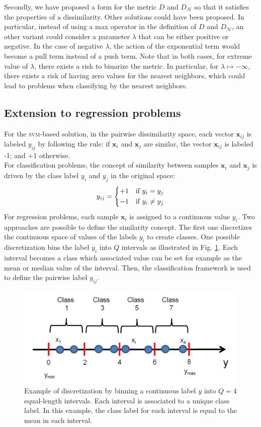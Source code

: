 Secondly, we have proposed a form for the metric $D$ and $D_\mathcal{H}$ so that it satisfies the properties of a dissimilarity. Other solutions could have been proposed. In particular, instead of using a max operator in the definition of $D$ and $D_\mathcal{H}$, an other variant could consider a parameter $\lambda$ that can be either positive or negative. In the case of negative $\lambda$, the action of the exponential term would become a pull term instead of a push term. Note that in both cases, for extreme value of $\lambda$, there exists a risk to binarize the metric. In particular, for $\lambda \mapsto - \infty$, there exists a risk of having zero values for the nearest neighbors, which could lead to problems when classifying by the nearest neighbors. 

\subsection*{Extension to regression problems}
For the \textsc{svm}-based solution, in the pairwise dissimilarity space, each vector $\textbf{x}_{ij}$ is labeled $y_{ij}$ by following the rule: if $\textbf{x}_i$ and $\textbf{x}_j$ are similar, the vector $\textbf{x}_{ij}$ is labeled -1; and +1 otherwise. \\
For classification problems, the concept of similarity between samples $\textbf{x}_i$ and $\textbf{x}_j$ is driven by the class label $y_i$ and $y_j$ in the original space:
\begin{equation}
y_{ij} = 
\left\{
\begin{split}
+1 \text{\quad if } y_i = y_j\\ 
-1 \text{\quad if } y_i \neq y_j
\end{split}
\right.
\end{equation}
For regression problems, each sample $\textbf{x}_i$ is assigned to a continuous value $y_i$. Two approaches are possible to define the similarity concept. The first one discretizes the continuous space of values of the labels $y_i$ to create classes. One possible discretization bins the label $y_i$ into $Q$ intervals as illustrated in Fig. \ref{fig:Discretize_binning}. Each interval becomes a class which associated value can be set for example as the mean or median value of the interval. Then, the classification framework is used to define the pairwise label $y_{ij}$.

\begin{figure}[h!]
	\centering
	\includegraphics[width=0.5\linewidth]{images/Discretize_binning}
	\caption[Example of discretization by binning a continuous label $y$ into $Q=4$ equal-length intervals.]{Example of discretization by binning a continuous label $y$ into $Q=4$ equal-length intervals. Each interval is associated to a unique class label. In this example, the class label for each interval is equal to the mean in each interval.}
	\label{fig:Discretize_binning}
\end{figure}

